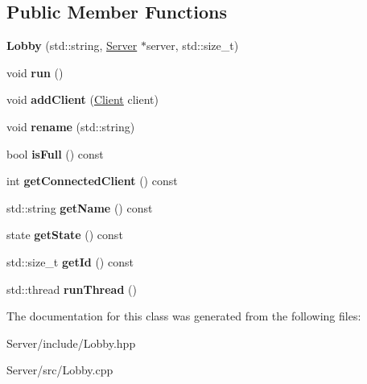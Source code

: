 \subsection*{Public Member Functions}
\begin{DoxyCompactItemize}
\item 
{\bfseries Lobby} (std\+::string, \hyperlink{class_server}{Server} $\ast$server, std\+::size\+\_\+t)\hypertarget{class_lobby_abf7eecfa8d2ecbb01608d145e88cc4d8}{}\label{class_lobby_abf7eecfa8d2ecbb01608d145e88cc4d8}

\item 
void {\bfseries run} ()\hypertarget{class_lobby_a99d48ffcc6a168f48547c60647fad5b2}{}\label{class_lobby_a99d48ffcc6a168f48547c60647fad5b2}

\item 
void {\bfseries add\+Client} (\hyperlink{class_client}{Client} client)\hypertarget{class_lobby_aecf2d5ec6475a8262a7c0ab101db5d52}{}\label{class_lobby_aecf2d5ec6475a8262a7c0ab101db5d52}

\item 
void {\bfseries rename} (std\+::string)\hypertarget{class_lobby_a5b706e64dc49d687236bae184ed90625}{}\label{class_lobby_a5b706e64dc49d687236bae184ed90625}

\item 
bool {\bfseries is\+Full} () const \hypertarget{class_lobby_aafa7a1d4fb0f34fddf6ca2a890c62a57}{}\label{class_lobby_aafa7a1d4fb0f34fddf6ca2a890c62a57}

\item 
int {\bfseries get\+Connected\+Client} () const \hypertarget{class_lobby_a6411cf3e2e6c9e3d7c4035a4ed8d385c}{}\label{class_lobby_a6411cf3e2e6c9e3d7c4035a4ed8d385c}

\item 
std\+::string {\bfseries get\+Name} () const \hypertarget{class_lobby_acfc62676498cd8d0f8aa136da9adb2bc}{}\label{class_lobby_acfc62676498cd8d0f8aa136da9adb2bc}

\item 
state {\bfseries get\+State} () const \hypertarget{class_lobby_ae413fdda9d2b5704d4d9b910ef1c9dc9}{}\label{class_lobby_ae413fdda9d2b5704d4d9b910ef1c9dc9}

\item 
std\+::size\+\_\+t {\bfseries get\+Id} () const \hypertarget{class_lobby_a277457383ec4005b13921613ed1ebe85}{}\label{class_lobby_a277457383ec4005b13921613ed1ebe85}

\item 
std\+::thread {\bfseries run\+Thread} ()\hypertarget{class_lobby_a31ca8839c7e228eb75ce2266b5dba95f}{}\label{class_lobby_a31ca8839c7e228eb75ce2266b5dba95f}

\end{DoxyCompactItemize}


The documentation for this class was generated from the following files\+:\begin{DoxyCompactItemize}
\item 
Server/include/Lobby.\+hpp\item 
Server/src/Lobby.\+cpp\end{DoxyCompactItemize}

